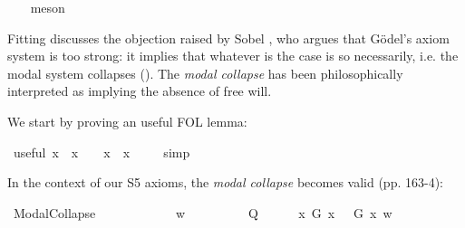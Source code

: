 \begin{isabellebody}
\ \ \isamarkupfalse%
\ meson\ %
%
\endisatagproof
{\isafoldproof}%
%
\isadelimproof
%
\endisadelimproof
%
\isamarkuptrue%
%
\begin{isamarkuptext}%
Fitting discusses the objection raised by Sobel \cite{sobel2004logic}, who argues that G\"odel's axiom system
 is too strong: it implies that whatever is the case is so necessarily, i.e. the modal system collapses (\isa{{\isasymphi}\ {\isasymlongrightarrow}\ {\isasymbox}{\isasymphi}}).
 The \emph{modal collapse} has been philosophically interpreted as implying the absence of free will.%
\end{isamarkuptext}\isamarkuptrue%
%
\begin{isamarkuptext}%
We start by proving an useful FOL lemma:%
\end{isamarkuptext}\isamarkuptrue%
\isamarkupfalse%
\ useful{\isacharcolon}\ {\isachardoublequoteopen}{\isacharparenleft}{\isasymforall}x{\isachardot}\ {\isasymphi}\ x\ {\isasymlongrightarrow}\ {\isasympsi}{\isacharparenright}\ {\isasymLongrightarrow}\ {\isacharparenleft}{\isacharparenleft}{\isasymexists}x{\isachardot}\ {\isasymphi}\ x{\isacharparenright}\ {\isasymlongrightarrow}\ {\isasympsi}{\isacharparenright}{\isachardoublequoteclose}%
\isadelimproof
\ %
\endisadelimproof
%
\isatagproof
{}\isamarkupfalse%
\ simp%
\endisatagproof
{\isafoldproof}%
%
\isadelimproof
%
\endisadelimproof
%
\begin{isamarkuptext}%
In the context of our S5 axioms, the \emph{modal collapse} becomes valid (pp. 163-4):%
\end{isamarkuptext}\isamarkuptrue%
\isamarkupfalse%
\ ModalCollapse{\isacharcolon}\ {\isachardoublequoteopen}{\isasymlfloor}\isactrlbold {\isasymforall}{\isasymPhi}{\isachardot}{\isacharparenleft}{\isasymPhi}\ \isactrlbold {\isasymrightarrow}\ {\isacharparenleft}\isactrlbold {\isasymbox}\ {\isasymPhi}{\isacharparenright}{\isacharparenright}{\isasymrfloor}{\isachardoublequoteclose}\isanewline
%
\isadelimproof
%
\endisadelimproof
%
\isatagproof
{}\isamarkupfalse%
\ {\isacharminus}\isanewline
\ \ \isacommand{{\isacharbraceleft}}\isamarkupfalse%
\isanewline
\ \ \isamarkupfalse%
\ w\isanewline
\ \ \ \isacommand{{\isacharbraceleft}}\isamarkupfalse%
\isanewline
\ \ \ \ \isamarkupfalse%
\ Q\isanewline
\ \ \ \ \isamarkupfalse%
\ {\isachardoublequoteopen}{\isacharparenleft}\isactrlbold {\isasymforall}x{\isachardot}\ G\ x\ \isactrlbold {\isasymrightarrow}\ {\isacharparenleft}{\isasymE}\ G\ x{\isacharparenright}{\isacharparenright}\ w{\isachardoublequoteclose}\ \isamarkupfalse%

\end{isabellebody}
